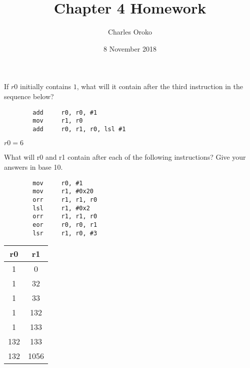\documentclass[12pt]{article}
\newenvironment{problem}[2][Problem]{\begin{trivlist}
\item[\hskip \labelsep {\bfseries #1}\hskip \labelsep {\bfseries #2.}]}{\end{trivlist}}
\begin{document}
 
 
\title{Chapter 4 Homework}%
\author{Charles Oroko} %
\date{8 November 2018}
\maketitle


\begin{problem}{4.1}
    If $r0$ initially contains $1$, what will it contain after the third instruction in the sequence below?
    \begin{verbatim}
        add     r0, r0, #1
        mov     r1, r0
        add     r0, r1, r0, lsl #1
    \end{verbatim}

\end{problem}

$r0=6$


\begin{problem}{4.2}
    What will r0 and r1 contain after each of the following instructions? Give your answers in base 10.
    \begin{verbatim}
        mov     r0, #1
        mov     r1, #0x20
        orr     r1, r1, r0
        lsl     r1, #0x2
        orr     r1, r1, r0
        eor     r0, r0, r1
        lsr     r1, r0, #3
    \end{verbatim}

    \begin{table}
        \begin{tabular}{cc}
            r0 & r1 \\
            \hline
            1 & 0\\
            1 & 32\\
            1 & 33\\
            1 & 132\\
            1 & 133\\
            132 & 133\\
            132 & 1056
        \end{tabular}
    \end{table}
\end{problem}
\end{document}
